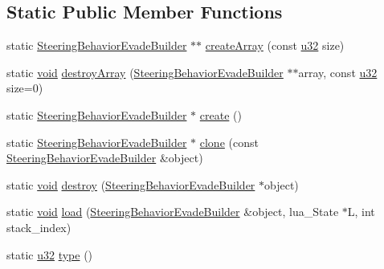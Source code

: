 \subsection*{Static Public Member Functions}
\begin{DoxyCompactItemize}
\item 
static \mbox{\hyperlink{classnjli_1_1_steering_behavior_evade_builder}{Steering\+Behavior\+Evade\+Builder}} $\ast$$\ast$ \mbox{\hyperlink{classnjli_1_1_steering_behavior_evade_builder_af6700d938518bb5051c0d972d164f53a}{create\+Array}} (const \mbox{\hyperlink{_util_8h_a10e94b422ef0c20dcdec20d31a1f5049}{u32}} size)
\item 
static \mbox{\hyperlink{_thread_8h_af1e856da2e658414cb2456cb6f7ebc66}{void}} \mbox{\hyperlink{classnjli_1_1_steering_behavior_evade_builder_a0e2d712186d55408630706dc250a0664}{destroy\+Array}} (\mbox{\hyperlink{classnjli_1_1_steering_behavior_evade_builder}{Steering\+Behavior\+Evade\+Builder}} $\ast$$\ast$array, const \mbox{\hyperlink{_util_8h_a10e94b422ef0c20dcdec20d31a1f5049}{u32}} size=0)
\item 
static \mbox{\hyperlink{classnjli_1_1_steering_behavior_evade_builder}{Steering\+Behavior\+Evade\+Builder}} $\ast$ \mbox{\hyperlink{classnjli_1_1_steering_behavior_evade_builder_a95adf43ab644e79d5dcc53a5b2620981}{create}} ()
\item 
static \mbox{\hyperlink{classnjli_1_1_steering_behavior_evade_builder}{Steering\+Behavior\+Evade\+Builder}} $\ast$ \mbox{\hyperlink{classnjli_1_1_steering_behavior_evade_builder_ac0994fe63ce131aa9d295887e9098fce}{clone}} (const \mbox{\hyperlink{classnjli_1_1_steering_behavior_evade_builder}{Steering\+Behavior\+Evade\+Builder}} \&object)
\item 
static \mbox{\hyperlink{_thread_8h_af1e856da2e658414cb2456cb6f7ebc66}{void}} \mbox{\hyperlink{classnjli_1_1_steering_behavior_evade_builder_af99d88947146d4aaf51e279760d327b2}{destroy}} (\mbox{\hyperlink{classnjli_1_1_steering_behavior_evade_builder}{Steering\+Behavior\+Evade\+Builder}} $\ast$object)
\item 
static \mbox{\hyperlink{_thread_8h_af1e856da2e658414cb2456cb6f7ebc66}{void}} \mbox{\hyperlink{classnjli_1_1_steering_behavior_evade_builder_a4c45f5567afe5062f152933c8cac55e1}{load}} (\mbox{\hyperlink{classnjli_1_1_steering_behavior_evade_builder}{Steering\+Behavior\+Evade\+Builder}} \&object, lua\+\_\+\+State $\ast$L, int stack\+\_\+index)
\item 
static \mbox{\hyperlink{_util_8h_a10e94b422ef0c20dcdec20d31a1f5049}{u32}} \mbox{\hyperlink{classnjli_1_1_steering_behavior_evade_builder_a7f11e366113188486e67abecb5d1fbda}{type}} ()
\end{DoxyCompactItemize}
